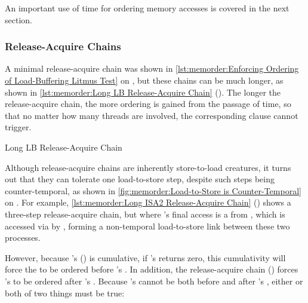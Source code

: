 An important use of time for ordering memory accesses is covered in the
next section.

\subsubsection{Release-Acquire Chains}
\label{sec:memorder:Release-Acquire Chains}

A minimal release-acquire chain was shown in
\cref{lst:memorder:Enforcing Ordering of Load-Buffering Litmus Test}
on
,
but these chains can be much longer, as shown in
\cref{lst:memorder:Long LB Release-Acquire Chain}
().
The longer the release-acquire chain, the more ordering is gained
from the passage of time, so that no matter how many threads are
involved, the corresponding  clause cannot trigger.

\begin{listing}

\caption{Long LB Release-Acquire Chain}
\label{lst:memorder:Long LB Release-Acquire Chain}
\end{listing}

Although release-acquire chains are inherently store-to-load creatures,
it turns out that they can tolerate one load-to-store step, despite
such steps being counter-temporal, as shown in
\cref{fig:memorder:Load-to-Store is Counter-Temporal}
on
.
For example,
\cref{lst:memorder:Long ISA2 Release-Acquire Chain}
()
shows a three-step release-acquire chain, but where 's
final access is a  from , which is
accessed via  by , forming a non-temporal
load-to-store link between these two processes.
\begin{fcvref}
However, because 's  ()
is cumulative, if 's  returns zero,
this cumulativity will force the  to be ordered
before 's .
In addition, the release-acquire chain
()
forces 's  to be ordered after 's
.
Because 's  cannot be both before and after
's , either or both of two things must
be true:
\end{fcvref}

